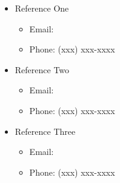 \documentclass[12pt]{article}
\begin{document}
 \pagestyle{plain}








\begin{itemize}
	\item Reference One
	\begin{itemize}
		\item Email: 
		\item Phone: (xxx) xxx-xxxx
	\end{itemize}
	\item Reference Two
	\begin{itemize}
		\item Email: 
		\item Phone: (xxx) xxx-xxxx
	\end{itemize}
	\item Reference Three
	\begin{itemize}
		\item Email: 
		\item Phone: (xxx) xxx-xxxx
	\end{itemize}
\end{itemize}


\end{document}
